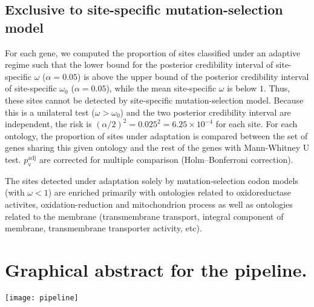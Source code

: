 \documentclass{article}
\begin{document}
    \subsection{Exclusive to site-specific mutation-selection model}
    \label{subsec:exclusive-to-mutation-selection-codon-method}

    For each gene, we computed the proportion of sites classified under an adaptive regime such that the lower bound for the posterior credibility interval of site-specific $\omega$ ($\alpha=0.05$) is above the upper bound of the posterior credibility interval of site-specific $\omega_{0}$ ($\alpha=0.05$), while the mean site-specific $\omega$ is below $1$.
    Thus, these sites cannot be detected by site-specific mutation-selection model.
    Because this is a unilateral test ($\omega > \omega_{0}$) and the two posterior credibility interval are independent, the risk is $(\alpha/2)^2=0.025^2=6.25 \times 10^{-4}$ for each site.
    For each ontology, the proportion of sites under adaptation is compared between the set of genes sharing this given ontology and the rest of the genes with Mann-Whitney U test.
    $p_{\mathrm{v}}^{\mathrm{adj}}$ are corrected for multiple comparison (Holm–Bonferroni correction).

    \begin{center}
        \footnotesize
        
    \end{center}

    The sites detected under adaptation solely by mutation-selection codon models (with $\omega < 1$) are enriched primarily with ontologies related to oxidoreductase activites, oxidation-reduction and mitochondrion process as well as ontologies related to the membrane (transmembrane transport, integral component of membrane, transmembrane transporter activity, etc).

    \pagebreak


    \section{Graphical abstract for the pipeline.}
    \label{subsec:method-summary}

    \begin{center}
        \texttt{[image: pipeline]}
    \end{center}
\end{document}
